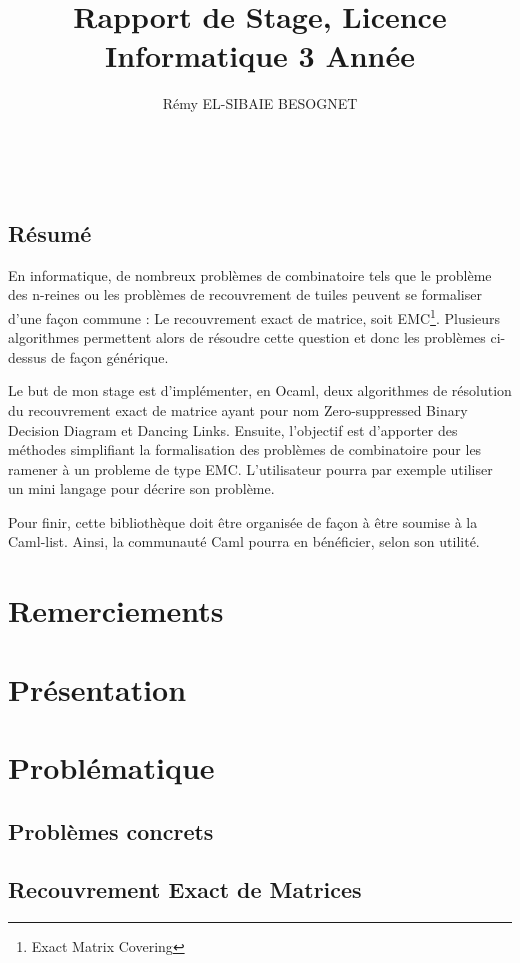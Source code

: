 \documentclass[a4paper]{article}
\title{Rapport de Stage, Licence Informatique 3\up{ème} Année}
\author{Rémy \textsc{EL-SIBAIE BESOGNET}}
\begin{document}


~
\vfill

\begin{center}
\section*{Résumé}
\end{center}
En informatique, de nombreux problèmes de combinatoire tels que le problème des 
n-reines ou les problèmes de recouvrement de tuiles peuvent se formaliser d'une
façon commune :
Le recouvrement exact de matrice, soit EMC\footnote{Exact Matrix Covering}. 
Plusieurs algorithmes permettent alors 
de résoudre cette question et donc les problèmes ci-dessus de façon générique.

Le but de mon stage est d'implémenter, en Ocaml, deux algorithmes de
résolution du recouvrement exact de matrice ayant pour nom 
Zero-suppressed Binary Decision
Diagram et Dancing Links. 
Ensuite, l'objectif est d'apporter des méthodes 
simplifiant la formalisation des problèmes de combinatoire pour les ramener
à un probleme de type EMC. L'utilisateur pourra par 
exemple utiliser un mini langage pour décrire son problème.

Pour finir, cette bibliothèque doit être organisée de façon à être soumise à la 
Caml-list. Ainsi, la communauté Caml pourra en bénéficier, selon son utilité.

\vfill




\newpage
\section*{Remerciements}

\newpage
\tableofcontents
\newpage
\listoffigures

\newpage
\section{Présentation}


\section{Problématique}
\subsection{Problèmes concrets}
\subsection{Recouvrement Exact de Matrices}
\end{document}
